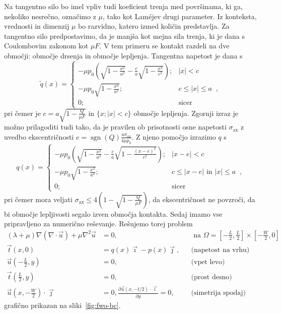 \documentclass[12pt,a4paper,twoside]{article}
\theoremstyle{definition} %
\theoremstyle{plain} %
\numberwithin{equation}{section}
\newcommand{\dpar}[2]{\ensuremath{\frac{\partial #1}{\partial #2}}}
\newcommand{\vt}{\vec{t}}
\newcommand{\vu}{\vec{u}}
\newcommand{\vi}{\vec{\imath}}
\newcommand{\vj}{\vec{\jmath}}
\newcommand{\sax}{\ensuremath{\sigma_{\text{ax}}}}
\DeclareMathOperator{\sgn}{sgn}
\begin{document}
Na tangentno silo bo imel vpliv tudi koeficient trenja med površinama, ki ga, nekoliko nesrečno,
označimo z $\mu$, tako kot Lam\'ejev drugi parameter. Iz konteksta, vrednosti in dimenzij $\mu$ bo
razvidno, katero izmed količin predstavlja. Za tangentno silo predpostavimo, da je manjša kot mejna
sila trenja, ki je dana s Coulombovim zakonom kot $\mu F$. V tem primeru se kontakt razdeli na dve
območji: območje drsenja in območje lepljenja. Tangentna napetost je dana s
\begin{equation}
  \tilde q(x) = \begin{cases}
      -\mu p_0 \left(\sqrt{1 - \frac{x^2}{a^2}} - \frac{c}{a}\sqrt{1 - \frac{x^2}{c^2}}\right);& |x|
      < c \\
      -\mu p_0 \sqrt{1 - \frac{x^2}{a^2}}; & c \leq |x| \leq a \;\;,\\
      0; & \text{sicer}
    \end{cases}
\end{equation}
pri čemer je $c = a\sqrt{1 - \frac{Q}{\mu F}}$ in $\{x; |x| < c\}$ območje lepljenja.
Zgornji izraz je možno prilagoditi tudi tako, da je pravilen ob prisotnosti osne napetosti
$\sax$ z uvedbo ekscentričnosti $e = \sgn(Q)\frac{a \sax}{4 \mu p_0}$.
Z njeno pomočjo izrazimo $q$ s
\begin{equation}
q(x) = \begin{cases}
-\mu p_0 \left(\sqrt{1 - \frac{x^2}{a^2}} - \frac{c}{a}\sqrt{1 - \frac{(x-e)^2}{c^2}}\right); &
|x-e| < c \\
-\mu p_0 \sqrt{1 - \frac{x^2}{a^2}}; & c \leq | x - e | \text{ in } |x| \leq a  \;\;,\\
0; & \text{sicer}
\end{cases}
\end{equation}
pri čemer mora veljati $\sax \leq 4\left( 1 - \sqrt{1-\frac{Q}{\mu F}} \right)$, da ekscentričnost
ne povzroči, da bi območje lepljivosti segalo izven območja kontakta. Sedaj imamo vse pripravljeno
za numerično reševanje. Rešujemo torej problem
\begin{align}
  (\lambda + \mu) \nabla(\nabla\cdot \vu) + \mu \nabla^2 \vu &= 0, && \text{ na } \Omega =
  [-\frac{L}{2}, \frac{L}{2}]\times[-\frac{W}{2}, 0] \nonumber  \\
  \vt(x, 0) &= q(x)\vi - p(x)\vj, && \text{(napetost na vrhu)} \nonumber \\
    \vu(-\frac{L}{2}, y) &= 0,  && \text{(vpet levo)} \label{eq:fwo-problem}\\
    \vt(\frac{L}{2}, y) &= 0, \nonumber  && \text{(prost desno)}\\
    \vu(x, -\frac{W}{2})\cdot \vj &= 0, \dpar{\vu(x, -t/2)\cdot \vi}{y} = 0, \nonumber  && \text{(simetrija
    spodaj)}
\end{align}
grafično prikazan na sliki~\ref{fig:fwo-bc}.
\end{document}
